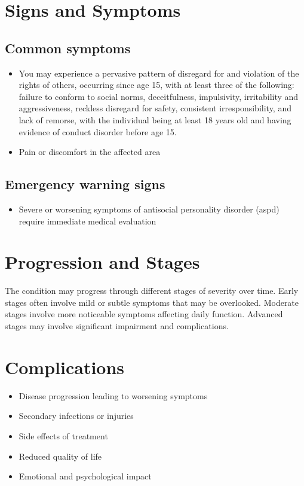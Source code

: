 \section{Signs and Symptoms}
\subsection{Common symptoms}
\begin{itemize}[noitemsep]
  \item You may experience a pervasive pattern of disregard for and violation of the rights of others, occurring since age 15, with at least three of the following: failure to conform to social norms, deceitfulness, impulsivity, irritability and aggressiveness, reckless disregard for safety, consistent irresponsibility, and lack of remorse, with the individual being at least 18 years old and having evidence of conduct disorder before age 15.
  \item Pain or discomfort in the affected area
  \end{itemize}
\subsection{Emergency warning signs}
\begin{itemize}[noitemsep]
  \item Severe or worsening symptoms of antisocial personality disorder (aspd) require immediate medical evaluation
\end{itemize}
\section{Progression and Stages}
The condition may progress through different stages of severity over time. Early stages often involve mild or subtle symptoms that may be overlooked. Moderate stages involve more noticeable symptoms affecting daily function. Advanced stages may involve significant impairment and complications.
\section{Complications}
\begin{itemize}[noitemsep]
  \item Disease progression leading to worsening symptoms
  \item Secondary infections or injuries
  \item Side effects of treatment
  \item Reduced quality of life
  \item Emotional and psychological impact
\end{itemize}
